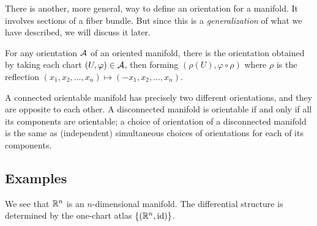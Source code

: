\begin{remark}
There is another, more general, way to define an orientation for a
manifold. It involves sections of a fiber bundle. But since this is a
\emph{generalization} of what we have described, we will discuss it
later.
\end{remark}

\begin{definition}
For any orientation $\mathcal{A}$ of an oriented manifold, there is the 
orientation obtained by taking each chart $(U,\varphi)\in\mathcal{A}$,
then forming $(\rho(U),\varphi\circ\rho)$ where $\rho$ is the reflection
$(x_{1}, x_{2},\dots, x_{n})\mapsto(-x_{1},x_{2},\dots,x_{n})$. 
\end{definition}

\begin{proposition}
A connected orientable manifold has precisely two different
orientations, and they are opposite to each other. A disconnected
manifold is orientable if and only if all its components are orientable;
a choice of orientation of a disconnected manifold is the same as
(independent) simultaneous choices of orientations for each of its components.
\end{proposition}

\subsection{Examples}

\begin{example}
We see that $\mathbb{R}^{n}$ is an $n$-dimensional manifold. The differential
structure is determined by the one-chart atlas $\{(\mathbb{R}^{n},\operatorname{id})\}$.
\end{example}